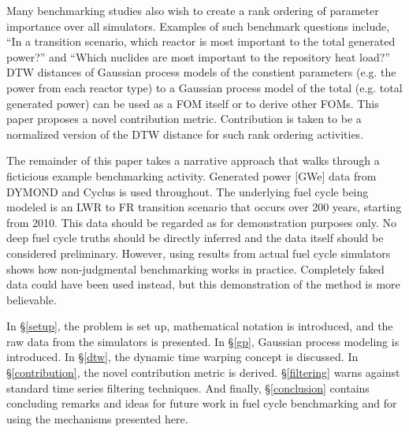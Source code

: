 Many benchmarking studies also wish to create a rank ordering of parameter
importance over all simulators. Examples of such benchmark questions include, 
``In a transition scenario,
which reactor is most important to the total generated power?'' and ``Which
nuclides are most important to the repository heat load?'' DTW distances 
of Gaussian process models of the constient parameters (e.g. the power from
each reactor type) to a Gaussian process model of the total (e.g. total 
generated power) can be used as a FOM itself or to derive other FOMs. 
This paper proposes a novel contribution metric. 
Contribution is taken to be a normalized version of the DTW 
distance for such rank ordering activities.

The remainder of this paper takes a narrative approach that walks through 
a ficticious example benchmarking activity. Generated power [GWe] data 
from DYMOND \cite{yacout2005modeling,feng2015dymond} and Cyclus 
\cite{DBLP:journals/corr/HuffGCFMOSSW15,cyclus_v1_0} is used throughout. 
The underlying fuel cycle being modeled is an
LWR to FR transition scenario that occurs over 200 years, starting from 2010.  
This data should be regarded as for demonstration purposes only. No deep
fuel cycle truths should be directly inferred and the data itself should be 
considered preliminary. However, 
using results from actual fuel cycle simulators shows how
non-judgmental benchmarking works in practice. Completely faked data could 
have been used instead, but this demonstration of the method is more 
believable.

In \S \ref{setup}, the problem is set up, mathematical notation is introduced,
and the raw data from the simulators is presented. In \S \ref{gp}, Gaussian 
process 
modeling is introduced. In \S \ref{dtw}, the dynamic time warping concept is
discussed. In \S \ref{contribution}, the novel contribution metric is 
derived.
\S \ref{filtering} warns against standard time series filtering
techniques. And finally, \S \ref{conclusion} contains concluding remarks
and ideas for future work in fuel cycle benchmarking and for 
using the mechanisms presented here.
